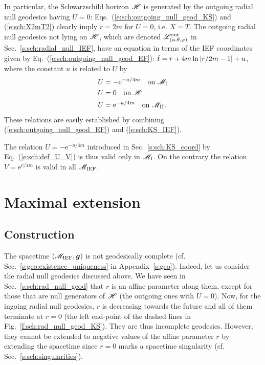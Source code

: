 In particular, the Schwarzschild horizon $\mathscr{H}$ is generated by the
outgoing radial null geodesics having $U=0$:
Eqs.~(\ref{e:sch:outgoing_null_geod_KS}) and (\ref{e:sch:X2mT2})
clearly imply $r=2m$ for $U=0$, i.e. $X=T$.
The outgoing radial null geodesics not lying on $\mathscr{H}$, which are
denoted $\mathscr{L}^{\rm out}_{(u,\theta,\varphi)}$ in Sec.~\ref{s:sch:radial_null_IEF}, have an equation
in terms of the IEF coordinates given by
Eq.~(\ref{e:sch:outgoing_null_geod_EF}):
${\tilde t} = r + 4 m \ln \left|r/2m- 1 \right| + u$,
where the constant $u$ is related to $U$ by
\begin{subequations}
\begin{align}
 & U = - \mathrm{e}^{-u/4m} \quad \mbox{on}\ \mathscr{M}_{\rm I} \\
 & U = 0 \quad \mbox{on}\ \mathscr{H} \\
 & U =  \mathrm{e}^{-u/4m} \quad \mbox{on}\ \mathscr{M}_{\rm II} .
\end{align}
\end{subequations}
These relations are easily established by combining
(\ref{e:sch:outgoing_null_geod_EF}) and (\ref{e:sch:KS_IEF}).


\begin{remark}
The relation $U = - \mathrm{e}^{-u/4m}$ introduced in Sec.~\ref{s:sch:KS_coord}
by Eq.~(\ref{e:sch:def_U_V}) is thus valid only in $\mathscr{M}_{\rm I}$. On the
contrary the relation $V = \mathrm{e}^{v/4m}$ is valid in all $\mathscr{M}_{\rm IEF}$.
\end{remark}

\section{Maximal extension} \label{s:sch:max_extens}

\subsection{Construction} \label{s:sch:max_extens_constr}

The spacetime $(\mathscr{M}_{\rm IEF}, \bm{g})$ is not geodesically complete (cf. Sec.~\ref{s:geo:existence_uniqueness} in Appendix~\ref{s:geo}).
Indeed, let us consider the radial null geodesics discussed above.
We have seen in Sec.~\ref{s:sch:rad_null_geod} that $r$ is an affine parameter
along them, except for those that are null generators of $\mathscr{H}$
(the outgoing ones with $U=0$).
Now, for the ingoing radial null geodesics, $r$ is decreasing towards the
future and all of them terminate at $r=0$ (the left end-point of the dashed
lines in Fig.~\ref{f:sch:rad_null_geod_KS}).
They are thus incomplete geodesics. However, they cannot be extended to
negative values of the affine parameter $r$ by extending the spacetime
since $r=0$ marks a spacetime singularity (cf. Sec.~\ref{s:sch:singularities}).

